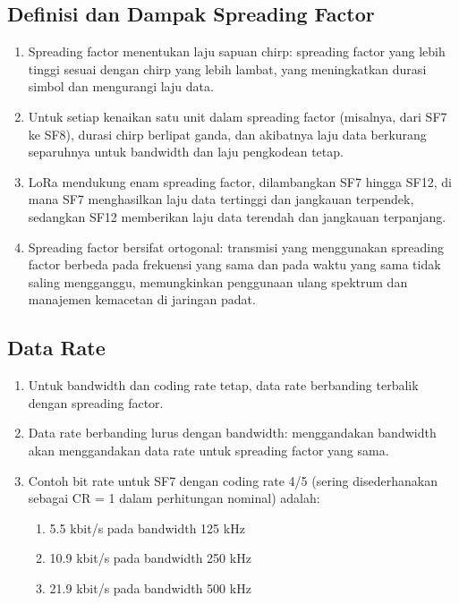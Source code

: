 \subsection{Definisi dan Dampak Spreading Factor}
\begin{enumerate}
    \item Spreading factor menentukan laju sapuan chirp: spreading factor yang lebih tinggi sesuai dengan chirp yang lebih lambat, yang meningkatkan durasi simbol dan mengurangi laju data.
    \item Untuk setiap kenaikan satu unit dalam spreading factor (misalnya, dari SF7 ke SF8), durasi chirp berlipat ganda, dan akibatnya laju data berkurang separuhnya untuk bandwidth dan laju pengkodean tetap.
    \item LoRa mendukung enam spreading factor, dilambangkan SF7 hingga SF12, di mana SF7 menghasilkan laju data tertinggi dan jangkauan terpendek, sedangkan SF12 memberikan laju data terendah dan jangkauan terpanjang.
    \item Spreading factor bersifat ortogonal: transmisi yang menggunakan spreading factor berbeda pada frekuensi yang sama dan pada waktu yang sama tidak saling mengganggu, memungkinkan penggunaan ulang spektrum dan manajemen kemacetan di jaringan padat.
\end{enumerate}
\subsection{Data Rate}
\begin{enumerate}
    \item Untuk bandwidth dan coding rate tetap, data rate berbanding terbalik dengan spreading factor.
    \item Data rate berbanding lurus dengan bandwidth: menggandakan bandwidth akan menggandakan data rate untuk spreading factor yang sama.
    \item Contoh bit rate untuk SF7 dengan coding rate 4/5 (sering disederhanakan sebagai CR = 1 dalam perhitungan nominal) adalah:
          \begin{enumerate}
              \item 5.5 kbit/s pada bandwidth 125 kHz
              \item 10.9 kbit/s pada bandwidth 250 kHz
              \item 21.9 kbit/s pada bandwidth 500 kHz
          \end{enumerate}
\end{enumerate}
